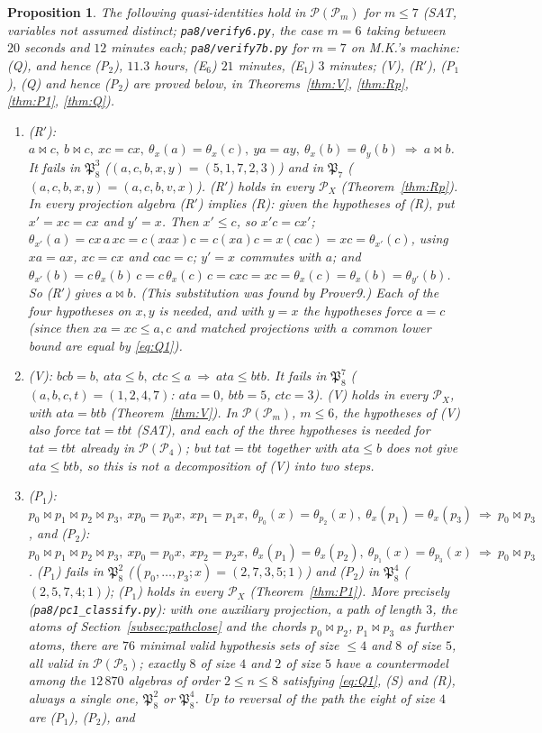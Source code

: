 \documentclass[11pt]{amsart}
\newtheorem{proposition}[theorem]{Proposition}
\theoremstyle{definition}
\renewcommand{\P}{\mathcal{P}}
\newcommand{\mt}{\bowtie}   %
\begin{document}
\begin{proposition}\label{prop:census8}
The following quasi-identities hold in $\P(\P_m)$ for $m\le7$ (SAT, variables not assumed distinct; \texttt{pa8/verify6.py}, the case $m=6$ taking between $20$ seconds and $12$ minutes each; \texttt{pa8/verify7b.py} for $m=7$ on M.K.'s machine: (Q), and hence (P$_2$), $11.3$ hours, (E$_6$) $21$ minutes, (E$_1$) $3$ minutes; (V), (R$'$), (P$_1$), (Q) and hence (P$_2$) are proved below, in Theorems~\ref{thm:V}, \ref{thm:Rp}, \ref{thm:P1}, \ref{thm:Q}).
\begin{enumerate}[label=\textup{(\alph*)},nosep]
\item \textup{(R$'$)}: $a\mt c,\ b\mt c,\ xc=cx,\ \theta_x(a)=\theta_x(c),\ ya=ay,\ \theta_x(b)=\theta_y(b)\ \Longrightarrow\ a\mt b$. It fails in $\mathfrak P_8^3$ ($(a,c,b,x,y)=(5,1,7,2,3)$) and in $\mathfrak P_7$ ($(a,c,b,x,y)=(a,c,b,v,x)$). (R$'$) holds in every $\P_X$ (Theorem~\ref{thm:Rp}). In every projection algebra (R$'$) implies (R): given the hypotheses of (R), put $x'=xc=cx$ and $y'=x$. Then $x'\le c$, so $x'c=cx'$; $\theta_{x'}(a)=cx\,a\,xc=c(xax)c=c(xa)c=x(cac)=xc=\theta_{x'}(c)$, using $xa=ax$, $xc=cx$ and $cac=c$; $y'=x$ commutes with $a$; and $\theta_{x'}(b)=c\,\theta_x(b)\,c=c\,\theta_x(c)\,c=cxc=xc=\theta_x(c)=\theta_x(b)=\theta_{y'}(b)$. So (R$'$) gives $a\mt b$. (This substitution was found by Prover9.) Each of the four hypotheses on $x,y$ is needed, and with $y=x$ the hypotheses force $a=c$ (since then $xa=xc\le a,c$ and matched projections with a common lower bound are equal by \eqref{eq:Q1}).
\item \textup{(V)}: $bcb=b,\ ata\le b,\ ctc\le a\ \Longrightarrow\ ata\le btb$. It fails in $\mathfrak P_8^7$ ($(a,b,c,t)=(1,2,4,7)$: $ata=0$, $btb=5$, $ctc=3$). (V) holds in every $\P_X$, with $ata=btb$ (Theorem~\ref{thm:V}). In $\P(\P_m)$, $m\le6$, the hypotheses of (V) also force $tat=tbt$ (SAT), and each of the three hypotheses is needed for $tat=tbt$ already in $\P(\P_4)$; but $tat=tbt$ together with $ata\le b$ does not give $ata\le btb$, so this is not a decomposition of (V) into two steps.
\item \textup{(P$_1$)}: $p_0\mt p_1\mt p_2\mt p_3,\ xp_0=p_0x,\ xp_1=p_1x,\ \theta_{p_0}(x)=\theta_{p_2}(x),\ \theta_x(p_1)=\theta_x(p_3)\ \Longrightarrow\ p_0\mt p_3$, and \textup{(P$_2$)}: $p_0\mt p_1\mt p_2\mt p_3,\ xp_0=p_0x,\ xp_2=p_2x,\ \theta_x(p_1)=\theta_x(p_2),\ \theta_{p_1}(x)=\theta_{p_3}(x)\ \Longrightarrow\ p_0\mt p_3$. (P$_1$) fails in $\mathfrak P_8^2$ ($(p_0,\dots,p_3;x)=(2,7,3,5;1)$) and (P$_2$) in $\mathfrak P_8^4$ ($(2,5,7,4;1)$); (P$_1$) holds in every $\P_X$ (Theorem~\ref{thm:P1}). More precisely (\texttt{pa8/pc1\_classify.py}): with one auxiliary projection, a path of length $3$, the atoms of Section~\ref{subsec:pathclose} and the chords $p_0\mt p_2$, $p_1\mt p_3$ as further atoms, there are $76$ minimal valid hypothesis sets of size $\le4$ and $8$ of size $5$, all valid in $\P(\P_5)$; exactly $8$ of size $4$ and $2$ of size $5$ have a countermodel among the $12\,870$ algebras of order $2\le n\le8$ satisfying \eqref{eq:Q1}, (S) and (R), always a single one, $\mathfrak P_8^2$ or $\mathfrak P_8^4$. Up to reversal of the path the eight of size $4$ are (P$_1$), (P$_2$), and

\end{enumerate}
\end{proposition}
\end{document}
